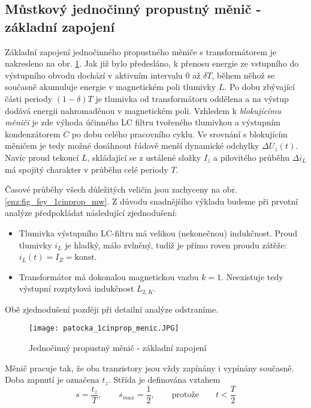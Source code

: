   \subsection{Můstkový jednočinný propustný měnič - základní zapojení}
    Základní zapojení jednočinného propustného měniče s transformátorem je nakresleno na obr. 
    \ref{enz:fig_fey_1cinprop_m}. Jak již bylo předesláno, k přenosu energie ze vstupního do 
    výstupního obvodu dochází v aktivním intervalu \(0\) až \(\delta T\), během něhož se současně 
    akumuluje energie v magnetickém poli tlumivky \(L\). Po dobu zbývající části periody 
    $(1-\delta)T$ je tlumivka od transformátoru oddělena a na výstup dodává energii nahromaděnou  
    v magnetickém poli. Vzhledem k \emph{blokujícímu měniči} je zde výhoda účinného LC filtru 
    tvořeného tlumivkou a výstupním kondenzátorem \(C\) po dobu celého pracovního cyklu. Ve 
    srovnání s blokujícím měničem je tedy možné dosáhnout řádově menší dynamické odchylky 
    \(\Delta U_z(t)\). Navíc proud tekoucí \(L\), skládající se z ustálené složky $I_z$ a 
    pilovitého průběhu $\Delta i_L$ má spojitý charakter v průběhu celé periody $T$. 
    
    Časové průběhy všech důležitých veličin jsou zachyceny na obr. \ref{enz:fig_fey_1cinprop_mw}. 
    Z důvodu snadnějšího výkladu budeme při prvotní analýze předpokládat následující zjednodušení:

    \begin{itemize}[noitemsep]
      \item Tlumivka výstupního LC-filtru má velikou (nekonečnou) indukčnost. Proud tlumivky  
            \(i_L\) je hladký, málo zvlněný, tudíž je přímo roven proudu zátěže: \(i_L(t) = I_Z = 
            \text{konst}\).
      \item Transformátor má dokonalou magnetickou vazbu \(k=1\). Neexistuje tedy výstupní 
            rozptylová indukčnost \(L_{2,K}\).
    \end{itemize}
    Obě zjednodušení později při detailní analýze odstraníme.
    
    \begin{figure}[ht!]
      \texttt{[image: patocka\_1cinprop\_menic.JPG]}
      \caption{Jednočinný propustný měnič - základní zapojení}
      \label{enz:fig_fey_1cinprop_m}
    \end{figure}
  
    Měnič pracuje tak, že oba tranzistory jsou vždy zapínány i vypínány současně. Doba zapnutí je 
    označena \(t_z\). Střída je definována vztahem
    \begin{equation}\label{enz:eq_1cinpropm01}
      s = \frac{t_z}{T}, \qquad s_{max} = \frac{1}{2}, \qquad \text{protože} \qquad t<\frac{T}{2}
    \end{equation}     

